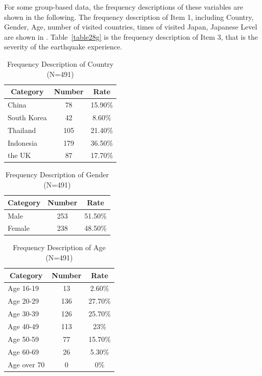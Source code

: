 For some group-based data, the frequency descriptions of these variables are shown in the following. The frequency description of Item 1, including Country, Gender, Age, number of visited countries, times of visited Japan, Japanese Level are shown in . Table~\ref{table28g} is the frequency description of Item 3, that is the severity of the earthquake experience.

\begin{table}[h]
  \caption[Frequency Description of Country]{Frequency Description of Country (N=491)}
  \label{table28a}
  \centering
  \begin{tabular}{l|cc}
 \hline
\multicolumn{1}{c|}{Category}&Number&Rate\\
 \hline
China&78&15.90\%\\
South Korea&42&8.60\%\\
Thailand&105&21.40\%\\
Indonesia&179&36.50\%\\
the UK&87&17.70\%\\
 \hline
  \end{tabular}
\end{table}

\begin{table}[h]
  \caption[Frequency Description of Gender]{Frequency Description of Gender (N=491)}
  \label{table28b}
  \centering
  \begin{tabular}{l|cc}
 \hline
\multicolumn{1}{c|}{Category}&Number&Rate\\
 \hline
Male   & 253 & 51.50\% \\
Female & 238 & 48.50\% \\
 \hline
  \end{tabular}
\end{table}

\begin{table}[h]
  \caption[Frequency Description of Age]{Frequency Description of Age (N=491)}
  \label{table28c}
  \centering
  \begin{tabular}{l|cc}
 \hline
\multicolumn{1}{c|}{Category}&Number&Rate\\
 \hline
Age 16-19   & 13  & 2.60\%  \\
Age 20-29   & 136 & 27.70\% \\
Age 30-39   & 126 & 25.70\% \\
Age 40-49   & 113 & 23\%    \\
Age 50-59   & 77  & 15.70\% \\
Age 60-69   & 26  & 5.30\%  \\
Age over 70 & 0   & 0\% \\
 \hline
  \end{tabular}
\end{table}

